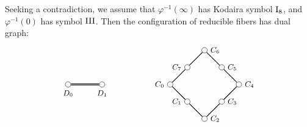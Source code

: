 \documentclass[oneside, 12pt]{amsart}
\theoremstyle{definition}
\theoremstyle{remark}
\newcommand{\I}{\text{\rm I}}
\newcommand{\III}{\text{\rm III}}
\begin{document}
\proof
Seeking a contradiction, we assume that $\varphi^{-1}(\infty)$ has Kodaira symbol $\I_8$, and $\varphi^{-1}(0)$ has symbol $\III$.
Then   the configuration of reducible fibers has dual graph:
%  
%  
\begin{equation*}
\begin{gathered}
\begin{tikzpicture}
[node distance=1cm, font=\small]
\tikzstyle{vertex}=[circle, draw, fill=white, inner sep=0mm, minimum size=1.5ex]
\node[vertex]	(C0)  	at (0,0)[label=left:{$C_0$}] 		{};
\node[vertex]	(C1)			[below right of=C0, label=left:{$C_1$}]	{};
\node[vertex]	(C2)			[below right of=C1, label=right:{$C_2$}]	{};
\node[vertex]	(C3)			[above right of=C2, label=right:{$C_3$}]	{};
\node[vertex]	(C4)			[above right of=C3, label=right:{$C_4$}]	{};
\node[vertex]	(C5)			[above left of=C4, label=right:{$C_5$}]	{};
\node[vertex]	(C6)			[above left of=C5, label=right:{$C_6$}]	{};
\node[vertex]	(C7)			[below left of=C6, label=left:{$C_7$}]	{};
 
\node[]         (E)             [left of=C0,  xshift=-0.4cm,  label=below:{$$}]	{};
\node[vertex]	(D1)			[left of=E,  xshift=-0.4cm,  label=below:{$D_1$}]	{};
\node[vertex]	(D0)			[left of=D1,  xshift=-0.4cm, label=below:{$D_0$}]	{};
 
\draw[thick] (C0)--(C1)--(C2)--(C3)--(C4)--(C5)--(C6)--(C7)--(C0);
\draw[thick,double] (D0)--(D1);
\end{tikzpicture}
\end{gathered}
\end{equation*}
\end{document}
